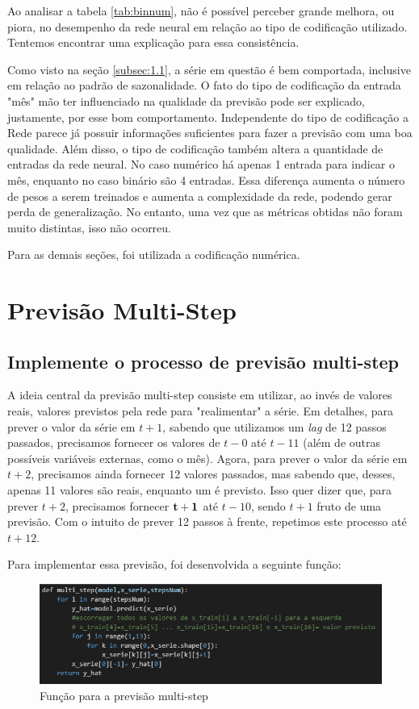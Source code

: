 \documentclass[12pt]{article}
\begin{document}
	Ao analisar a tabela \ref{tab:binnum}, não é possível perceber grande melhora, ou piora, no desempenho da rede neural em relação ao tipo de codificação utilizado. Tentemos encontrar uma explicação para essa consistência. 
	
	Como visto na seção \ref{subsec:1.1}, a série em questão é bem comportada, inclusive em relação ao padrão de sazonalidade. O fato do tipo de codificação da entrada "mês" mão ter influenciado na qualidade da previsão pode ser explicado, justamente, por esse bom comportamento. Independente do tipo de codificação a Rede parece já possuir informações suficientes para fazer a previsão com uma boa qualidade. Além disso, o tipo de codificação também altera a quantidade de entradas da rede neural. No caso numérico há apenas 1 entrada para indicar o mês, enquanto no caso binário são 4 entradas. Essa diferença aumenta o número de pesos a serem treinados e aumenta a complexidade da rede, podendo gerar perda de generalização. No entanto, uma vez que as métricas obtidas não foram muito distintas, isso não ocorreu.
	
	Para as demais seções, foi utilizada a codificação numérica.
	
	\section{Previsão Multi-Step}
	
	\subsection{Implemente o processo de previsão multi-step}\label{subsec:multi1}
	
	A ideia central da previsão multi-step consiste em utilizar, ao invés de valores reais, valores previstos pela rede para "realimentar" a série. Em detalhes, para prever o valor da série em $t+1$, sabendo que utilizamos um \textit{lag} de 12 passos passados, precisamos fornecer os valores de $t-0$ até $t-11$ (além de outras possíveis variáveis externas, como o mês). Agora, para prever o valor da série em $t+2$, precisamos ainda fornecer 12 valores passados, mas sabendo que, desses, apenas 11 valores são reais, enquanto um é previsto. Isso quer dizer que, para prever $t+2$, precisamos fornecer $\bf{t+1}$ até $t-10$, sendo $t+1$ fruto de uma previsão. Com o intuito de prever 12 passos à frente, repetimos este processo até $t+12$.
	
	Para implementar essa previsão, foi desenvolvida a seguinte função:
	\begin{figure}[H]
		\centering
		\includegraphics[width=0.7\linewidth]{Imagens/multistep/defmultistep}
		\caption{Função para a previsão multi-step}
		\label{fig:defmultistep}
	\end{figure}
	
\end{document}
